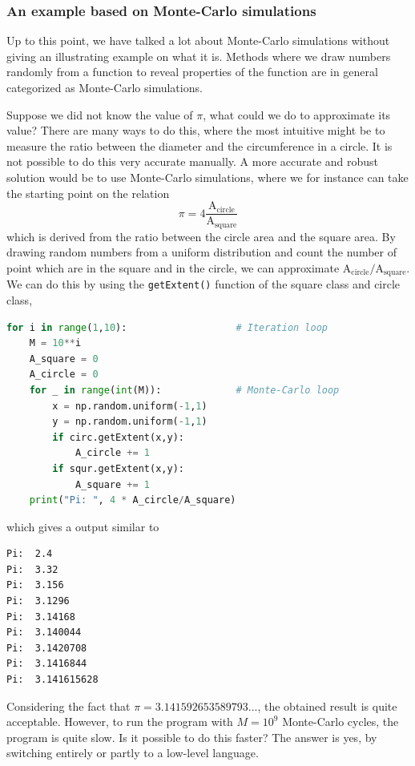 \subsubsection{An example based on Monte-Carlo simulations}
Up to this point, we have talked a lot about Monte-Carlo simulations without giving an illustrating example on what it is. Methods where we draw numbers randomly from a function to reveal properties of the function are in general categorized as Monte-Carlo simulations. 

Suppose we did not know the value of $\pi$, what could we do to approximate its value? There are many ways to do this, where the most intuitive might be to measure the ratio between the diameter and the circumference in a circle. It is not possible to do this very accurate manually. A more accurate and robust solution would be to use Monte-Carlo simulations, where we for instance can take the starting point on the relation
\begin{equation}
\pi=4\frac{\text{A}_{\text{circle}}}{\text{A}_{\text{square}}}
\end{equation}
which is derived from the ratio between the circle area and the square area. By drawing random numbers from a uniform distribution and count the number of point which are in the square and in the circle, we can approximate $\text{A}_{\text{circle}}/\text{A}_{\text{square}}$. We can do this by using the \texttt{getExtent()} function of the square class and circle class,
\lstset{basicstyle=\scriptsize}
\begin{lstlisting}[language=python]
for i in range(1,10):					# Iteration loop
	M = 10**i
	A_square = 0
	A_circle = 0
	for _ in range(int(M)):				# Monte-Carlo loop
		x = np.random.uniform(-1,1)
		y = np.random.uniform(-1,1)
		if circ.getExtent(x,y):
			A_circle += 1
		if squr.getExtent(x,y):
			A_square += 1
	print("Pi: ", 4 * A_circle/A_square)
\end{lstlisting}
which gives a output similar to
\begin{lstlisting}
Pi:  2.4
Pi:  3.32
Pi:  3.156
Pi:  3.1296
Pi:  3.14168
Pi:  3.140044
Pi:  3.1420708
Pi:  3.1416844
Pi:  3.141615628
\end{lstlisting}
Considering the fact that $\pi=3.141592653589793...$, the obtained result is quite acceptable. However, to run the program with $M=10^9$ Monte-Carlo cycles, the program is quite slow. Is it possible to do this faster? The answer is yes, by switching entirely or partly to a low-level language.


